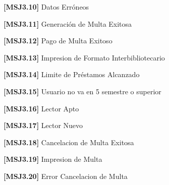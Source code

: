	\begin{Citemize}
	\item {\bf [MSJ3.10]} Datos Erróneos
	\end{Citemize}
	
	\begin{Citemize}
	\item {\bf [MSJ3.11]} Generación de Multa Exitosa
	\end{Citemize}
	
	\begin{Citemize}
	\item {\bf [MSJ3.12]} Pago de Multa Exitoso
	\end{Citemize}
	
	\begin{Citemize}
	\item {\bf [MSJ3.13]} Impresion de Formato Interbibliotecario
	\end{Citemize}
	
	\begin{Citemize}
	\item {\bf [MSJ3.14]} Limite de Préstamos Alcanzado
	\end{Citemize}
	
	\begin{Citemize}
	\item {\bf [MSJ3.15]} Usuario no va en 5 semestre o superior
	\end{Citemize}
	
	\begin{Citemize}
	\item {\bf [MSJ3.16]} Lector Apto
	\end{Citemize}
	
	\begin{Citemize}
	\item {\bf [MSJ3.17]} Lector Nuevo
	\end{Citemize}
	
	\begin{Citemize}
	\item {\bf [MSJ3.18]} Cancelacion de Multa Exitosa
	\end{Citemize}

	\begin{Citemize}
	\item {\bf [MSJ3.19]} Impresion de Multa
	\end{Citemize}
	
	\begin{Citemize}
	\item {\bf [MSJ3.20]} Error Cancelacion de Multa
	\end{Citemize}
	
